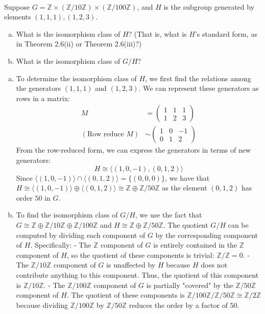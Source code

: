\documentclass{article}
\def\zz{{\mathbb Z}}
\begin{document}
\begin{problem} \\
    Suppose $G = \zz \times (\zz/10\zz) \times (\zz/100\zz)$, and $H$ is the subgroup generated by elements $(1,1,1), (1,2,3)$.
    \begin{enumerate}[(a)]
        \item What is the isomorphism class of $H$? (That is, what is $H$'s standard form, as in Theorem 2.6(ii) or Theorem 2.6(iii)?)
        \item What is the isomorphism class of $G/H$?
    \end{enumerate}
\end{problem}


\begin{enumerate}[(a)]
    \item To determine the isomorphism class of $H$, we first find the relations among the generators $(1,1,1)$ and $(1,2,3)$. We can represent these generators as rows in a matrix:
     \begin{align*}
        M &= \begin{pmatrix}
            1 & 1 & 1 \\
            1 & 2 & 3
        \end{pmatrix} \\
        (\text{Row reduce } M) &\sim \begin{pmatrix}
            1 & 0 & -1 \\
            0 & 1 & 2
        \end{pmatrix}
    \end{align*}
    From the row-reduced form, we can express the generators in terms of new generators:
    \[
        H \cong \langle (1,0,-1), (0,1,2) \rangle 
    \]
    Since $\langle (1,0,-1) \rangle \cap \langle (0,1,2) \rangle = \{(0,0,0)\}$, we have that $H \cong \langle (1,0,-1) \rangle \oplus \langle (0,1,2) \rangle \cong \zz \oplus \zz/50\zz$ as the element $(0,1,2)$ has order $50$ in $G$.
    
    \item To find the isomorphism class of $G/H$, we use the fact that $G \cong \zz \oplus \zz/10\zz \oplus \zz/100\zz$ and $H \cong \zz \oplus \zz/50\zz$. The quotient $G/H$ can be computed by dividing each component of $G$ by the corresponding component of $H$. Specifically:
        - The $\zz$ component of $G$ is entirely contained in the $\zz$ component of $H$, so the quotient of these components is trivial: $\zz / \zz = 0$.
        - The $\zz/10\zz$ component of $G$ is unaffected by $H$ because $H$ does not contribute anything to this component. Thus, the quotient of this component is $\zz/10\zz$.
        - The $\zz/100\zz$ component of $G$ is partially "covered" by the $\zz/50\zz$ component of $H$. The quotient of these components is $\zz/100\zz / \zz/50\zz \cong \zz/2\zz$ because dividing $\zz/100\zz$ by $\zz/50\zz$ reduces the order by a factor of $50$.


\end{enumerate}
\end{document}
